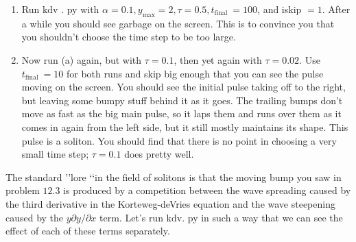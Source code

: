 \documentclass{book}
\theoremstyle{plain}
\theoremstyle{definition}
\numberwithin{exm}{chapter}
\theoremstyle{remark}
\theoremstyle{summary}
\theoremstyle{overview}
\begin{document}
\begin{enumerate}[label=(\alph*)]
\item Run kdv . py with $\alpha=0.1, y_{\max }=2, \tau=0.5, t_{\text {final }}=100$, and iskip $=1$. After a while you should see garbage on the screen. This is to convince you that you shouldn't choose the time step to be too large.
\item Now run (a) again, but with $\tau=0.1$, then yet again with $\tau=0.02$. Use $t_{\text {final }}=10$ for both runs and skip big enough that you can see the pulse moving on the screen. You should see the initial pulse taking off to the right, but leaving some bumpy stuff behind it as it goes. The trailing bumps don\rq t move as fast as the big main pulse, so it laps them and runs over them as it comes in again from the left side, but it still mostly maintains its shape. This pulse is a soliton. You should find that there is no point in choosing a very small time step; $\tau=0.1$ does pretty well.

\end{enumerate}

The standard \rq\rq lore \lq\lq in the field of solitons is that the moving bump you saw in problem $12.3$ is produced by a competition between the wave spreading caused by the third derivative in the Korteweg-deVries equation and the wave steepening caused by the $y \partial y / \partial x$ term. Let\rq s run $\mathrm{kdv}$. py in such a way that we can see the effect of each of these terms separately.
\end{document}
